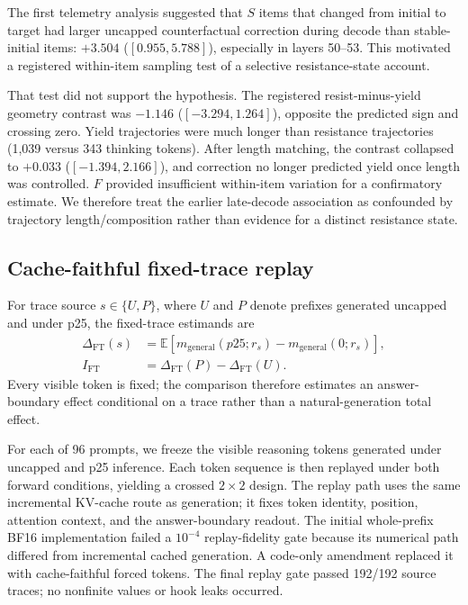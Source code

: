 \documentclass[letterpaper]{article}
\begin{document}
The first telemetry analysis suggested that $S$ items that changed from initial to target had larger uncapped counterfactual correction during decode than stable-initial items: $+3.504$ ($[0.955,5.788]$), especially in layers 50--53.  This motivated a registered within-item sampling test of a selective resistance-state account.

That test did not support the hypothesis.  The registered resist-minus-yield geometry contrast was $-1.146$ ($[-3.294,1.264]$), opposite the predicted sign and crossing zero.  Yield trajectories were much longer than resistance trajectories (1,039 versus 343 thinking tokens).  After length matching, the contrast collapsed to $+0.033$ ($[-1.394,2.166]$), and correction no longer predicted yield once length was controlled.  $F$ provided insufficient within-item variation for a confirmatory estimate.  We therefore treat the earlier late-decode association as confounded by trajectory length/composition rather than evidence for a distinct resistance state.

\subsection{Cache-faithful fixed-trace replay}

For trace source $s\in\{U,P\}$, where $U$ and $P$ denote prefixes generated uncapped and under p25, the fixed-trace estimands are
\begin{align}
\Delta_{\mathrm{FT}}(s)
&=\mathbb{E}\!\left[m_{\mathrm{general}}(p25;r_s)-m_{\mathrm{general}}(0;r_s)\right],\\
I_{\mathrm{FT}}&=\Delta_{\mathrm{FT}}(P)-\Delta_{\mathrm{FT}}(U).
\end{align}
Every visible token is fixed; the comparison therefore estimates an answer-boundary effect conditional on a trace rather than a natural-generation total effect.

For each of 96 prompts, we freeze the visible reasoning tokens generated under uncapped and p25 inference.  Each token sequence is then replayed under both forward conditions, yielding a crossed $2\times2$ design.  The replay path uses the same incremental KV-cache route as generation; it fixes token identity, position, attention context, and the answer-boundary readout.  The initial whole-prefix BF16 implementation failed a $10^{-4}$ replay-fidelity gate because its numerical path differed from incremental cached generation.  A code-only amendment replaced it with cache-faithful forced tokens.  The final replay gate passed 192/192 source traces; no nonfinite values or hook leaks occurred.
\end{document}
